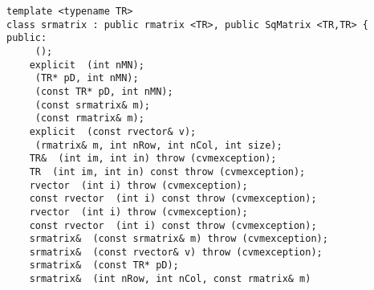 \bigskip
\noindent
\verb"template <typename TR>"\\
\verb"class srmatrix : public rmatrix <TR>, public SqMatrix <TR,TR> {"\\
\verb"public:"\\
\verb"    "\verb" ();"\\
\verb"    explicit "\verb" (int nMN);"\\
\verb"    "\verb" (TR* pD, int nMN);"\\
\verb"    "\verb" (const TR* pD, int nMN);"\\
\verb"    "\verb" (const srmatrix& m);"\\
\verb"    "\verb" (const rmatrix& m);"\\
\verb"    explicit "\verb" (const rvector& v);"\\
\verb"    "\verb" (rmatrix& m, int nRow, int nCol, int size);"\\
\verb"    TR& "\verb" (int im, int in) throw (cvmexception);"\\
\verb"    TR "\verb" (int im, int in) const throw (cvmexception);"\\
\verb"    rvector "\verb" (int i) throw (cvmexception);"\\
\verb"    const rvector "\verb" (int i) const throw (cvmexception);"\\
\verb"    rvector "\verb" (int i) throw (cvmexception);"\\
\verb"    const rvector "\verb" (int i) const throw (cvmexception);"\\
\verb"    srmatrix& "\verb" (const srmatrix& m) throw (cvmexception);"\\
\verb"    srmatrix& "\verb" (const rvector& v) throw (cvmexception);"\\
\verb"    srmatrix& "\verb" (const TR* pD);"\\
\verb"    srmatrix& "\verb" (int nRow, int nCol, const rmatrix& m)"\\

